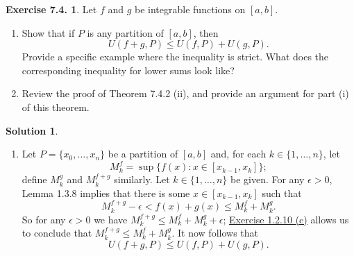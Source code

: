 \documentclass[12pt]{article}
\theoremstyle{definition}
\theoremstyle{exercise}
\newtheorem{exercise}{Exercise 7.4.}
\theoremstyle{solution}
\newtheorem*{solution}{Solution}
\begin{document}
\begin{exercise}
\label{ex:5}
    Let \( f \) and \( g \) be integrable functions on \( [a, b] \).
    \begin{enumerate}
        \item Show that if \( P \) is any partition of \( [a, b] \), then
        \[
            U(f + g, P) \leq U(f, P) + U(g, P).
        \]
        Provide a specific example where the inequality is strict. What does the corresponding inequality for lower sums look like?

        \item Review the proof of Theorem 7.4.2 (ii), and provide an argument for part (i) of this theorem.
    \end{enumerate}
\end{exercise}

\begin{solution}
    \begin{enumerate}
        \item Let \( P = \{ x_0, \ldots, x_n \} \) be a partition of \( [a, b] \) and, for each \( k \in \{ 1, \ldots, n \} \), let
        \[
            M_k^f = \sup \{ f(x) : x \in [x_{k-1}, x_k] \};
        \]
        define \( M_k^g \) and \( M_k^{f + g} \) similarly. Let \( k \in \{ 1, \ldots, n \} \) be given. For any \( \epsilon > 0 \), Lemma 1.3.8 implies that there is some \( x \in [x_{k-1}, x_k] \) such that
        \[
            M_k^{f + g} - \epsilon < f(x) + g(x) \leq M_k^f + M_k^g.
        \]
        So for any \( \epsilon > 0 \) we have \( M_k^{f + g} \leq M_k^f + M_k^g + \epsilon \); \href{https://lew98.github.io/Mathematics/UA_Section_1_2_Exercises.pdf}{Exercise 1.2.10 (c)} allows us to conclude that \( M_k^{f + g} \leq M_k^f + M_k^g \). It now follows that
        \[
            U(f + g, P) \leq U(f, P) + U(g, P).
        \]


\end{enumerate}
\end{solution}
\end{document}
